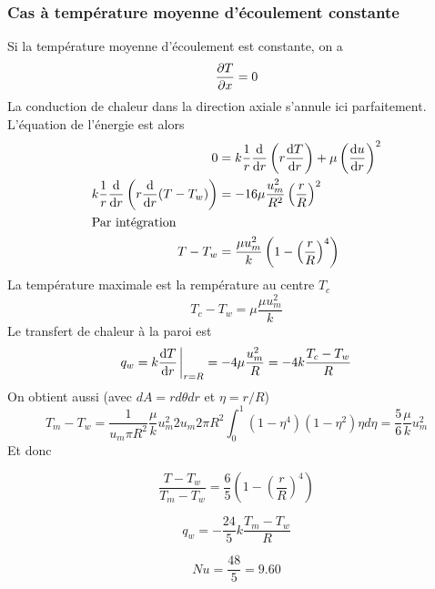 \documentclass[a4paper,11pt]{report}
\newcommand{\recip}[1]{\frac{1}{#1}}
\begin{document}
      \subsubsection{Cas à température moyenne d'écoulement constante}
        Si la température moyenne d'écoulement est constante, on a
        \begin{equation}
          \pdv{T}{x} = 0
        \end{equation}
        La conduction de chaleur dans la direction axiale s'annule ici parfaitement. L'équation de l'énergie est alors
        \begin{align}
          0 &= k \recip{r} \dv{r}\left(r\dv{T}{r}\right) + \mu \left(\dv{u}{r}\right)^2\\
          k \recip{r} \dv{r}\left(r\dv{r}(T-T_w)\right) &= - 16\mu \frac{u_m^2}{R^2} \left(\frac{r}{R}\right)^2 \\ \intertext{Par intégration}
          T-T_w &= \frac{\mu u_m^2}{k} \left(1-\left(\frac{r}{R}\right)^4\right)
        \end{align}
        La température maximale est la rempérature au centre $T_c$
        \begin{equation}
          T_c - T_w = \mu \frac{\mu u_m^2}{k}
        \end{equation}
        Le transfert de chaleur à la paroi est
        \begin{equation}
          q_w = k \dv{T}{r}\eval_{r=R} = -4\mu \frac{u_m^2}{R} = -4k \frac{T_c - T_w}{R}
        \end{equation}
        On obtient aussi (avec $dA = rd\theta dr$ et $\eta = r/R$)
        \begin{equation}
          T_m - T_w = \recip{u_m \pi R^2} \frac{\mu}{k} u_m^2 2 u_m 2\pi R^2 \int_0^1(1-\eta^4)(1-\eta^2) \eta d\eta = \frac{5}{6} \frac{\mu}{k} u_m^2
        \end{equation}
        Et donc
        \begin{multicols}{3}
          \begin{equation}
              \frac{T-T_w}{T_m - T_w} = \frac{6}{5} \left(1 - \left(\frac{r}{R}\right)^4\right) \nonumber
          \end{equation}

          \begin{equation}
            q_w = -\frac{24}{5}k\frac{T_m - T_w}{R} \nonumber
          \end{equation}

          \begin{equation}
            Nu = \frac{48}{5} = 9.60
          \end{equation}
        \end{multicols}
\end{document}
